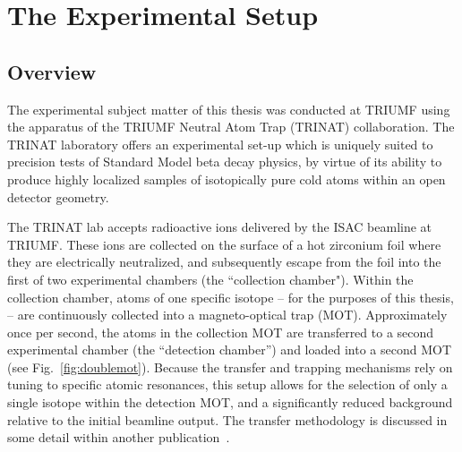 

\clearpage
\chapter{The Experimental Setup}
\label{setup_chapter}

\section{Overview}

The experimental subject matter of this thesis was conducted at TRIUMF using the apparatus of the TRIUMF Neutral Atom Trap (TRINAT) collaboration.  The TRINAT laboratory offers an experimental set-up which is uniquely suited to precision tests of Standard Model beta decay physics, by virtue of its ability to produce highly localized samples of isotopically pure cold atoms within an open detector geometry.  

The TRINAT lab accepts radioactive ions delivered by the ISAC beamline at TRIUMF.  These ions are collected on the surface of a hot zirconium  foil where they are electrically neutralized, and subsequently escape from the foil into the first of two experimental chambers (the ``collection chamber").  Within the collection chamber, atoms of one specific isotope -- for the purposes of this thesis,   -- are continuously collected into a magneto-optical trap (MOT).  Approximately once per second, the atoms in the collection MOT are transferred to a second experimental chamber (the ``detection chamber'') and loaded into a second MOT (see Fig.~\ref{fig:doublemot}).  Because the transfer and trapping mechanisms rely on tuning to specific atomic resonances, this setup allows for the selection of only a single isotope within the detection MOT, and a significantly reduced background relative to the initial beamline output.  The transfer methodology is discussed in some detail within another publication~\cite{swanson}.



